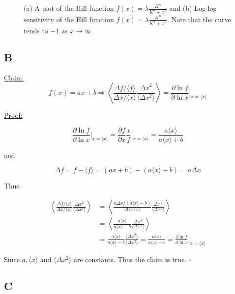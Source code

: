 \documentclass[a4paper,12pt]{article}
\begin{document}
\begin{figure}[!ht]
\caption{(a) A plot of the Hill function $f(x) = \lambda \frac{K^n}{K^n+x^n}$ and (b) Log-log sensitivity of the Hill function $f(x) = \lambda \frac{K^n}{K^n+x^n}$. Note that the curve tends to $-1$ as $x\longrightarrow \infty$ }
\label{fig:dev_hists}
\end{figure}

\subsection*{B}

\underline{Claim:} \[f(x) = a x+b \Rightarrow \left \langle \frac{\Delta f / \langle f \rangle}{\Delta x / \langle x \rangle}  \frac{{\Delta x}^2}{\langle \Delta x^2 \rangle} \right \rangle = \frac{\partial \ln f}{\partial \ln x} \bigg|_{x=\langle x \rangle} \]

\noindent \underline{Proof:}

\[ \frac{\partial \ln f}{\partial \ln x} \bigg|_{x=\langle x \rangle} = \frac{\partial f}{\partial x} \frac{x}{f} \bigg|_{x=\langle x \rangle} = \frac{a\langle x \rangle}{a \langle x \rangle + b}\]

and

\[ \Delta f = f - \langle f \rangle = (ax+b) - (a \langle x \rangle - b) = a \Delta x\]

Thus:

\begin{align*}
\left \langle \frac{\Delta f / \langle f \rangle}{\Delta x / \langle x \rangle} \frac{{\Delta x}^2}{\langle \Delta x^2 \rangle} \right \rangle & = \left \langle \frac{a \Delta x /( a \langle x \rangle - b)}{\Delta x / \langle x \rangle} \frac{\Delta x ^2}{\langle \Delta x ^2 \rangle} \right \rangle \\
&= \left \langle \frac{a \langle x \rangle}{a \langle x \rangle - b} \frac{\Delta x ^2}{\langle \Delta x ^2 \rangle} \right \rangle \\
&= \frac{a \langle x \rangle}{a \langle x \rangle - b} \frac{\langle \Delta x ^2 \rangle}{\langle \Delta x ^2 \rangle} = \frac{a \langle x \rangle}{a \langle x \rangle - b} = \frac{\partial \ln f}{\partial \ln x} \bigg|_{x=\langle x \rangle}
\end{align*}

Since $a, \langle x \rangle$ and $\langle \Delta x^2\rangle$ are constants. Thus the claim is true.  $\square$

\subsection*{C}
\end{document}
